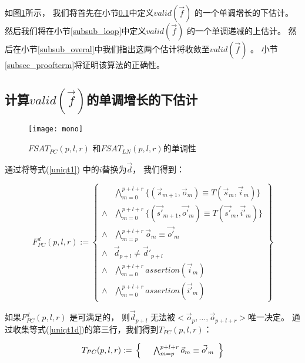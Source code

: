 

如图\ref{fig_mono_chap3}所示，
我们将首先在小节\ref{subsub_nonloop}中定义$valid(\vec{f})$ 的一个单调增长的下估计。
然后我们将在小节\ref{subsub_loop}中定义$valid(\vec{f})$ 的一个单调递减的上估计。
然后在小节\ref{subsub_overal}中我们指出这两个估计将收敛至$valid(\vec{f})$ 。
小节\ref{subsec_proofterm}将证明该算法的正确性。


\subsection{计算$valid(\vec{f})$的单调增长的下估计}\label{subsub_nonloop}

\begin{figure}[t]
\begin{center}
\texttt{[image: mono]}
\end{center}
\caption{$FSAT_{PC}(p,l,r)$ 和$FSAT_{LN}(p,l,r)$的单调性}
  \label{fig_mono_chap3}
\end{figure}

通过将等式(\ref{uniqt1}) 中的$i$替换为$\vec{d}$，
我们得到：

\begin{equation}\label{uniqt1d}
F^d_{PC}(p,l,r):=
\left\{
\begin{array}{cc}
&\bigwedge_{m=0}^{p+l+r}
\{
(\vec{s}_{m+1},\vec{o}_m)\equiv T(\vec{s}_m,\vec{i}_m)
\}
\\
\wedge&\bigwedge_{m=0}^{p+l+r}
\{
(\vec{s'}_{m+1},\vec{o'}_m)\equiv T(\vec{s'}_m,\vec{i'}_m)
\}
\\
\wedge&\bigwedge_{m=p}^{p+l+r}\vec{o}_m\equiv \vec{o'}_m \\
\wedge& \vec{d}_{p+l}\ne \vec{d}'_{p+l} \\
\wedge&\bigwedge_{m=0}^{p+l+r}assertion(\vec{i}_m) \\
\wedge&\bigwedge_{m=0}^{p+l+r}assertion(\vec{i'}_m)
\end{array}
\right\}
\end{equation}

如果$F^d_{PC}(p,l,r)$ 是可满足的，
则$\vec{d}_{p+l}$ 无法被$<\vec{o}_p,\dots,\vec{o}_{p+l+r}>$唯一决定。
通过收集等式(\ref{uniqt1d})的第三行，我们得到$T_{PC}(p,l,r)$：

\begin{equation}\label{tpc}
T_{PC}(p,l,r):=\\
\left\{
\begin{array}{cc}
      &\bigwedge_{m=p}^{p+l+r}\vec{o}_m\equiv \vec{o'}_m \\
\end{array}
\right\}
\end{equation}


